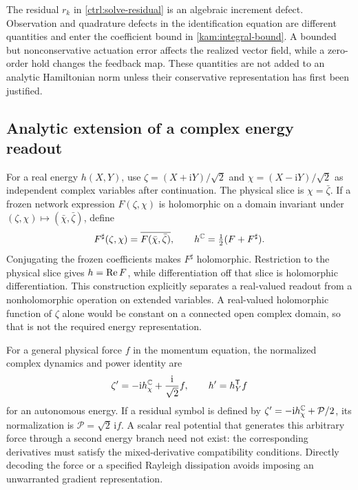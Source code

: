 The residual $r_k$ in \eqref{ctrl:solve-residual} is an algebraic increment defect. Observation and quadrature defects in the identification equation are different quantities and enter the coefficient bound in \eqref{kam:integral-bound}. A bounded but nonconservative actuation error affects the realized vector field, while a zero-order hold changes the feedback map. These quantities are not added to an analytic Hamiltonian norm unless their conservative representation has first been justified.

\subsection{Analytic extension of a complex energy readout}
\label{ss:analytic-extension}

For a real energy $h(X,Y)$, use
$\zeta=(X+\mathrm iY)/\sqrt2$ and
$\chi=(X-\mathrm iY)/\sqrt2$ as independent complex variables after continuation. The physical slice is $\chi=\bar\zeta$. If a frozen network expression $F(\zeta,\chi)$ is holomorphic on a domain invariant under $(\zeta,\chi)\mapsto(\bar\chi,\bar\zeta)$, define
\begin{equation}\label{ss:conjugate-extension}
 F^\sharp(\zeta,\chi)=\overline{F(\bar\chi,\bar\zeta)},
 \qquad h^{\mathbb C}=\tfrac12(F+F^\sharp).
\end{equation}
Conjugating the frozen coefficients makes $F^\sharp$ holomorphic. Restriction to the physical slice gives $h=\operatorname{Re} F$, while differentiation off that slice is holomorphic differentiation. This construction explicitly separates a real-valued readout from a nonholomorphic operation on extended variables. A real-valued holomorphic function of $\zeta$ alone would be constant on a connected open complex domain, so that is not the required energy representation.

For a general physical force $f$ in the momentum equation, the normalized complex dynamics and power identity are
\begin{equation}\label{ss:complex-force}
 \zeta'=-\mathrm i h_\chi^{\mathbb C}+\frac{\mathrm i}{\sqrt2}f,
 \qquad h'=h_Y^{\mathsf T}f
\end{equation}
for an autonomous energy. If a residual symbol is defined by $\zeta'=-\mathrm i h_\chi^{\mathbb C}+\mathcal P/2$, its normalization is $\mathcal P=\sqrt2\,\mathrm i f$. A scalar real potential that generates this arbitrary force through a second energy branch need not exist: the corresponding derivatives must satisfy the mixed-derivative compatibility conditions. Directly decoding the force or a specified Rayleigh dissipation avoids imposing an unwarranted gradient representation.

